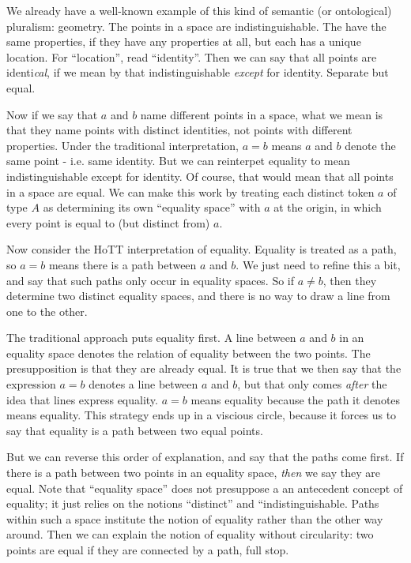 \documentclass{article}
\begin{document}
We already have a well-known example of this kind of semantic (or
ontological) pluralism: geometry. The points in a space are
indistinguishable. The have the same properties, if they have any
properties at all, but each has a unique location. For ``location'',
read ``identity''. Then we can say that all points are
identi\textit{cal}, if we mean by that indistinguishable
\textit{except} for identity.  Separate but equal.

Now if we say that \(a\) and \(b\) name different points in a space,
what we mean is that they name points with distinct identities, not
points with different properties. Under the traditional
interpretation, \(a=b\) means \(a\) and \(b\) denote the same point -
i.e. same identity. But we can reinterpet equality to mean
indistinguishable except for identity. Of course, that would mean that
all points in a space are equal. We can make this work by treating
each distinct token \(a\) of type \(A\) as determining its own
``equality space'' with \(a\) at the origin, in which every point is
equal to (but distinct from) \(a\).

Now consider the HoTT interpretation of equality. Equality is treated
as a path, so \(a=b\) means there is a path between \(a\) and \(b\).
We just need to refine this a bit, and say that such paths only occur
in equality spaces. So if \(a\neq b\), then they determine two
distinct equality spaces, and there is no way to draw a line from one
to the other.

The traditional approach puts equality first. A line between \(a\) and
\(b\) in an equality space denotes the relation of equality between
the two points. The presupposition is that they are already equal. It
is true that we then say that the expression \(a=b\) denotes a line
between \(a\) and \(b\), but that only comes \textit{after} the idea
that lines express equality. \(a=b\) means equality because the path
it denotes means equality. This strategy ends up in a viscious circle,
because it forces us to say that equality is a path between two equal
points.

But we can reverse this order of explanation, and say that the paths
come first. If there is a path between two points in an equality
space, \textit{then} we say they are equal. Note that ``equality
space'' does not presuppose a an antecedent concept of equality; it
just relies on the notions ``distinct'' and ``indistinguishable. Paths
within such a space institute the notion of equality rather than the
other way around. Then we can explain the notion of equality without
circularity: two points are equal if they are connected by a path,
full stop.
\end{document}

